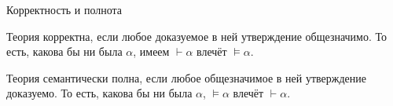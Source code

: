 \documentclass[aspectratio=169]{beamer}
\begin{document}
\begin{frame}{Корректность и полнота}
\begin{defrus}
Теория корректна, если любое доказуемое в ней утверждение общезначимо.
То есть, какова бы ни была $\alpha$, имеем $\vdash\alpha$ влечёт $\models\alpha$.
\end{defrus}

\begin{defrus}
Теория семантически полна, если любое общезначимое в ней утверждение доказуемо.
То есть, какова бы ни была $\alpha$, $\models\alpha$ влечёт $\vdash\alpha$.
\end{defrus}
\end{frame}

\end{document}

